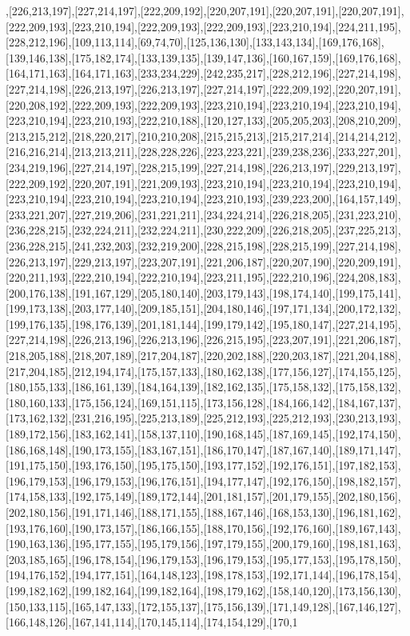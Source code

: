 ,[226,213,197],[227,214,197],[222,209,192],[220,207,191],[220,207,191],[220,207,191],[222,209,193],[223,210,194],[222,209,193],[222,209,193],[223,210,194],[224,211,195],[228,212,196],[109,113,114],[69,74,70],[125,136,130],[133,143,134],[169,176,168],[139,146,138],[175,182,174],[133,139,135],[139,147,136],[160,167,159],[169,176,168],[164,171,163],[164,171,163],[233,234,229],[242,235,217],[228,212,196],[227,214,198],[227,214,198],[226,213,197],[226,213,197],[227,214,197],[222,209,192],[220,207,191],[220,208,192],[222,209,193],[222,209,193],[223,210,194],[223,210,194],[223,210,194],[223,210,194],[223,210,193],[222,210,188],[120,127,133],[205,205,203],[208,210,209],[213,215,212],[218,220,217],[210,210,208],[215,215,213],[215,217,214],[214,214,212],[216,216,214],[213,213,211],[228,228,226],[223,223,221],[239,238,236],[233,227,201],[234,219,196],[227,214,197],[228,215,199],[227,214,198],[226,213,197],[229,213,197],[222,209,192],[220,207,191],[221,209,193],[223,210,194],[223,210,194],[223,210,194],[223,210,194],[223,210,194],[223,210,194],[223,210,193],[239,223,200],[164,157,149],[233,221,207],[227,219,206],[231,221,211],[234,224,214],[226,218,205],[231,223,210],[236,228,215],[232,224,211],[232,224,211],[230,222,209],[226,218,205],[237,225,213],[236,228,215],[241,232,203],[232,219,200],[228,215,198],[228,215,199],[227,214,198],[226,213,197],[229,213,197],[223,207,191],[221,206,187],[220,207,190],[220,209,191],[220,211,193],[222,210,194],[222,210,194],[223,211,195],[222,210,196],[224,208,183],[200,176,138],[191,167,129],[205,180,140],[203,179,143],[198,174,140],[199,175,141],[199,173,138],[203,177,140],[209,185,151],[204,180,146],[197,171,134],[200,172,132],[199,176,135],[198,176,139],[201,181,144],[199,179,142],[195,180,147],[227,214,195],[227,214,198],[226,213,196],[226,213,196],[226,215,195],[223,207,191],[221,206,187],[218,205,188],[218,207,189],[217,204,187],[220,202,188],[220,203,187],[221,204,188],[217,204,185],[212,194,174],[175,157,133],[180,162,138],[177,156,127],[174,155,125],[180,155,133],[186,161,139],[184,164,139],[182,162,135],[175,158,132],[175,158,132],[180,160,133],[175,156,124],[169,151,115],[173,156,128],[184,166,142],[184,167,137],[173,162,132],[231,216,195],[225,213,189],[225,212,193],[225,212,193],[230,213,193],[189,172,156],[183,162,141],[158,137,110],[190,168,145],[187,169,145],[192,174,150],[186,168,148],[190,173,155],[183,167,151],[186,170,147],[187,167,140],[189,171,147],[191,175,150],[193,176,150],[195,175,150],[193,177,152],[192,176,151],[197,182,153],[196,179,153],[196,179,153],[196,176,151],[194,177,147],[192,176,150],[198,182,157],[174,158,133],[192,175,149],[189,172,144],[201,181,157],[201,179,155],[202,180,156],[202,180,156],[191,171,146],[188,171,155],[188,167,146],[168,153,130],[196,181,162],[193,176,160],[190,173,157],[186,166,155],[188,170,156],[192,176,160],[189,167,143],[190,163,136],[195,177,155],[195,179,156],[197,179,155],[200,179,160],[198,181,163],[203,185,165],[196,178,154],[196,179,153],[196,179,153],[195,177,153],[195,178,150],[194,176,152],[194,177,151],[164,148,123],[198,178,153],[192,171,144],[196,178,154],[199,182,162],[199,182,164],[199,182,164],[198,179,162],[158,140,120],[173,156,130],[150,133,115],[165,147,133],[172,155,137],[175,156,139],[171,149,128],[167,146,127],[166,148,126],[167,141,114],[170,145,114],[174,154,129],[170,1